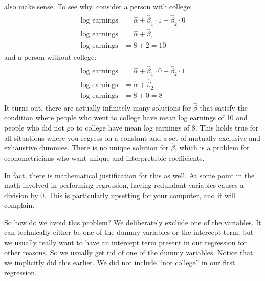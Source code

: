 \documentclass[letterpaper,10pt,english]{jupyterBook}
\begin{document}
\sphinxAtStartPar
also make sense. To see why, consider a person with college:
\begin{equation*}
\begin{split}\begin{aligned}
\text{log earnings} &= \hat{\alpha} + \hat{\beta}_1 \cdot 1 + \hat{\beta}_2 \cdot 0 \\
\text{log earnings} &= \hat{\alpha} + \hat{\beta}_1 \\
\text{log earnings} &= 8 + 2 = 10
\end{aligned}\end{split}
\end{equation*}
\sphinxAtStartPar
and a person without college:
\begin{equation*}
\begin{split}\begin{aligned}
\text{log earnings} &= \hat{\alpha} + \hat{\beta}_1 \cdot 0 + \hat{\beta}_2 \cdot 1 \\
\text{log earnings} &= \hat{\alpha} + \hat{\beta}_2 \\
\text{log earnings} &= 8 + 0 = 8
\end{aligned}\end{split}
\end{equation*}
\sphinxAtStartPar
It turns out, there are actually infinitely many solutions for \(\hat{\beta}\) that satisfy the condition where people who went to college have mean log earnings of 10 and people who did not go to college have mean log earnings of 8. This holds true for all situations where you regress on a constant and a set of mutually exclusive and exhaustive dummies. There is no unique solution for \(\hat{\beta}\), which is a problem for econometricians who want unique and interpretable coefficients.

\sphinxAtStartPar
In fact, there is mathematical justification for this as well. At some point in the math involved in performing regression, having redundant variables causes a division by 0. This is particularly upsetting for your computer, and it will complain.

\sphinxAtStartPar
So how do we avoid this problem? We deliberately exclude one of the variables. It can technically either be one of the dummy variables or the intercept term, but we usually really want to have an intercept term present in our regression for other reasons. So we usually get rid of one of the dummy variables. Notice that we implicitly did this earlier. We did not include “not college” in our first regression.
\end{document}
